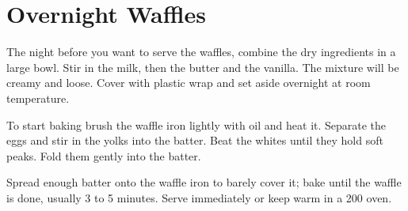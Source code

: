 \section{Overnight Waffles}
\begin{recipe}



	The night before you want to serve the waffles, combine the dry ingredients in a large bowl. Stir in the milk, then the butter and the vanilla. The mixture will be creamy and loose. Cover with plastic wrap and set aside overnight at room temperature.

	To start baking brush the waffle iron lightly with oil and heat it. Separate the eggs and stir in the yolks into the batter. Beat the whites until they hold soft peaks. Fold them gently into the batter.

	Spread enough batter onto the waffle iron to barely cover it; bake until the waffle is done, usually 3 to 5 minutes. Serve immediately or keep warm in a 200 oven.

\end{recipe}
